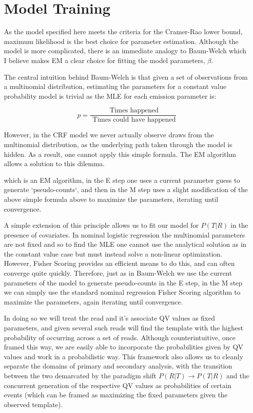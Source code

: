 \documentclass[fleqn,10pt]{SelfArx} %
\begin{document}
\section{Model Training}

As the model specified here meets the criteria for the Cramer-Rao lower bound, maximum likelihood is the best choice for parameter estimation.  Although the model is more complicated, there is an immediate analogy to Baum-Welch which I believe makes EM a clear choice for fitting the model parameters, $\beta$.

The central intuition behind Baum-Welch is that given a set of observations from a multinomial distribution, estimating the parameters for a constant value probability model is trivial as the MLE for each emission parameter is:

\begin{dmath}
p = \frac{\text{ Times happened}}{\text{ Times could have happened}}
\end{dmath}

However, in the CRF model we never actually observe draws from the multinomial distribution, as the underlying path taken through the model is hidden.  As a result, one cannot apply this simple formula.  The EM algorithm allows a solution to this dilemma. 

which is an EM algorithm, in the E step one uses a current parameter guess to generate `pseudo-counts`, and then in the M step uses a slight modification of the above simple formula above to maximize the parameters, iterating until convergence.

A simple extension of this principle allows us to fit our model for $P(T|R)$ in the presence of covariates.  In nominal logistic regression the multinomial parameters are not fixed and so to find the MLE one cannot use the analytical solution as in the constant value case but must instead solve a non-linear optimization.  However, Fisher Scoring provides an efficient means to do this, and can often converge quite quickly.  Therefore, just as in Baum-Welch we use the current parameters of the model to generate pseudo-counts in the E step, in the M step we can simply use the standard nominal regression Fisher Scoring algorithm to maximize the parameters, again iterating until convergence. 


In doing so we will treat the read and it's associate QV values as fixed parameters, and given several such reads will find the template with the highest probability of occurring across a set of reads.  Although counterintuitive, once framed this way, we are easily able to incorporate the probabilities given by QV values and work in a probabilistic way.  This framework also allows us to cleanly separate the domains of primary and secondary analysis, with the transition between the two demarcated by the paradigm shift  $P(R|T) \rightarrow P(T|R) $ and the concurrent generation of the respective QV values as probabilities of certain events (which can be framed as maximizing the fixed parameters given the observed template). 
\end{document}
